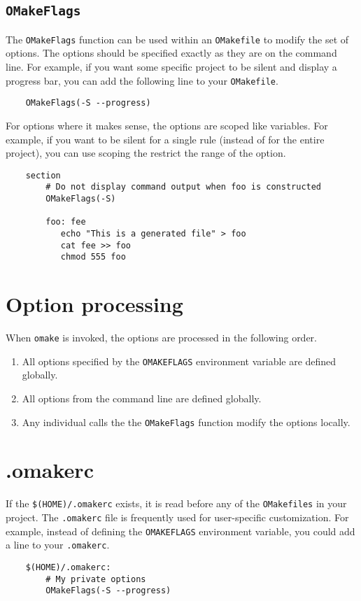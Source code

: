 \subsection{\texttt{OMakeFlags}}

The \verb+OMakeFlags+ function can be used within an \verb+OMakefile+ to modify
the set of options.  The options should be specified exactly as they are on the command line.  For
example, if you want some specific project to be silent and display a progress bar, you can add the
following line to your \verb+OMakefile+.

\begin{verbatim}
    OMakeFlags(-S --progress)
\end{verbatim}

For options where it makes sense, the options are scoped like variables.  For example, if you want
\OMake{} to be silent for a single rule (instead of for the entire project), you can use scoping the
restrict the range of the option.

\begin{verbatim}
    section
        # Do not display command output when foo is constructed
        OMakeFlags(-S)

        foo: fee
           echo "This is a generated file" > foo
           cat fee >> foo
           chmod 555 foo
\end{verbatim}

\section{Option processing}

When \verb+omake+ is invoked, the options are processed in the following order.

\begin{enumerate}
\item All options specified by the \verb+OMAKEFLAGS+ environment variable are defined globally.
\item All options from the command line are defined globally.
\item Any individual calls the the \verb+OMakeFlags+ function modify the options locally.
\end{enumerate}

\section{.omakerc}
\label{section:.omakerc}

If the \verb+$(HOME)/.omakerc+ exists, it is read before any of the \verb+OMakefiles+ in your
project.  The \verb+.omakerc+ file is frequently used for user-specific customization.
For example, instead of defining the \verb+OMAKEFLAGS+ environment variable, you could add
a line to your \verb+.omakerc+.

\begin{verbatim}
    $(HOME)/.omakerc:
        # My private options
        OMakeFlags(-S --progress)
\end{verbatim}    

